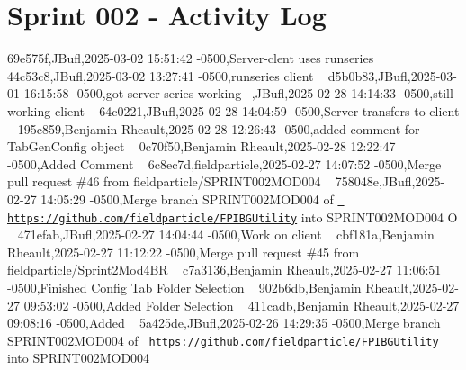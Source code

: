 \chapter{Sprint 002 -\/ Activity Log}
\hypertarget{page2}{}\label{page2}
69e575f,JBufl,2025-\/03-\/02 15\+:51\+:42 -\/0500,Server-\/clent uses runseries ~\newline
 44c53c8,JBufl,2025-\/03-\/02 13\+:27\+:41 -\/0500,runseries client ~\newline
 d5b0b83,JBufl,2025-\/03-\/01 16\+:15\+:58 -\/0500,got server series working ~,JBufl,2025-\/02-\/28 14\+:14\+:33 -\/0500,still working client ~\newline
 64c0221,JBufl,2025-\/02-\/28 14\+:04\+:59 -\/0500,Server transfers to client ~\newline
 195c859,Benjamin Rheault,2025-\/02-\/28 12\+:26\+:43 -\/0500,added comment for Tab\+Gen\+Config object ~\newline
 0c70f50,Benjamin Rheault,2025-\/02-\/28 12\+:22\+:47 -\/0500,Added Comment ~\newline
 6c8ec7d,fieldparticle,2025-\/02-\/27 14\+:07\+:52 -\/0500,Merge pull request \#46 from fieldparticle/\+SPRINT002\+MOD004 ~\newline
 758048e,JBufl,2025-\/02-\/27 14\+:05\+:29 -\/0500,Merge branch \textquotesingle{}SPRINT002\+MOD004\textquotesingle{} of \href{https://github.com/fieldparticle/FPIBGUtility}{\texttt{ https\+://github.\+com/fieldparticle/\+FPIBGUtility}} into SPRINT002\+MOD004 O ~\newline
 471efab,JBufl,2025-\/02-\/27 14\+:04\+:44 -\/0500,Work on client ~\newline
 cbf181a,Benjamin Rheault,2025-\/02-\/27 11\+:12\+:22 -\/0500,Merge pull request \#45 from fieldparticle/\+Sprint2\+Mod4\+BR ~\newline
 c7a3136,Benjamin Rheault,2025-\/02-\/27 11\+:06\+:51 -\/0500,Finished Config Tab Folder Selection ~\newline
 902b6db,Benjamin Rheault,2025-\/02-\/27 09\+:53\+:02 -\/0500,Added Folder Selection ~\newline
 411cadb,Benjamin Rheault,2025-\/02-\/27 09\+:08\+:16 -\/0500,Added  ~\newline
 5a425de,JBufl,2025-\/02-\/26 14\+:29\+:35 -\/0500,Merge branch \textquotesingle{}SPRINT002\+MOD004\textquotesingle{} of \href{https://github.com/fieldparticle/FPIBGUtility}{\texttt{ https\+://github.\+com/fieldparticle/\+FPIBGUtility}} into SPRINT002\+MOD004 ~\newline
